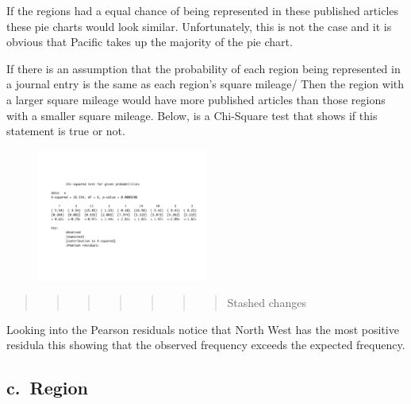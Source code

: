 \documentclass[
]{article}
\begin{document}
If the regions had a equal chance of being represented in these
published articles these pie charts would look similar. Unfortunately,
this is not the case and it is obvious that Pacific takes up the
majority of the pie chart.

If there is an assumption that the probability of each region being
represented in a journal entry is the same as each region's square
mileage/ Then the region with a larger square mileage would have more
published articles than those regions with a smaller square mileage.
Below, is a Chi-Square test that shows if this statement is true or not.

\begin{figure}
    \centering
    \includegraphics[width=0.50\textwidth]{RegionChiSquare2.pdf}
    \label{fig:Region XChi-Square}
\end{figure}

\begin{quote}
\begin{quote}
\begin{quote}
\begin{quote}
\begin{quote}
\begin{quote}
\begin{quote}
Stashed changes
\end{quote}
\end{quote}
\end{quote}
\end{quote}
\end{quote}
\end{quote}
\end{quote}

Looking into the Pearson residuals notice that North West has the most
positive residula this showing that the observed frequency exceeds the
expected frequency.

\hypertarget{c.-region-1}{%
\subsection{c.~Region}\label{c.-region-1}}
\end{document}
